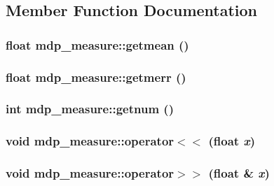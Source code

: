 \subsection{Member Function Documentation}
\hypertarget{classmdp__measure_a6ac1b96bc356ea6b614a672b06dab833}{
\subsubsection[{getmean}]{\setlength{\rightskip}{0pt plus 5cm}float mdp\_\-measure::getmean ()}}
\label{classmdp__measure_a6ac1b96bc356ea6b614a672b06dab833}
\hypertarget{classmdp__measure_a7661cd0bdff2e5f4a2054ef5c3446cb1}{
\subsubsection[{getmerr}]{\setlength{\rightskip}{0pt plus 5cm}float mdp\_\-measure::getmerr ()}}
\label{classmdp__measure_a7661cd0bdff2e5f4a2054ef5c3446cb1}
\hypertarget{classmdp__measure_af4311b3d6f7aeedd30df26c805df74d9}{
\subsubsection[{getnum}]{\setlength{\rightskip}{0pt plus 5cm}int mdp\_\-measure::getnum ()}}
\label{classmdp__measure_af4311b3d6f7aeedd30df26c805df74d9}
\hypertarget{classmdp__measure_ad1714e31ad9a1473c05f4aeeab9634e4}{
\subsubsection[{operator$<$$<$}]{\setlength{\rightskip}{0pt plus 5cm}void mdp\_\-measure::operator$<$$<$ (float {\em x})}}
\label{classmdp__measure_ad1714e31ad9a1473c05f4aeeab9634e4}
\hypertarget{classmdp__measure_a3d8873e8abbae44011ddcd69d23e0c9d}{
\subsubsection[{operator$>$$>$}]{\setlength{\rightskip}{0pt plus 5cm}void mdp\_\-measure::operator$>$$>$ (float \& {\em x})}}
